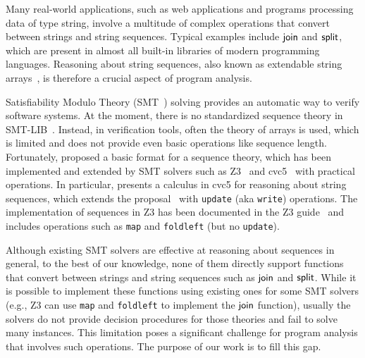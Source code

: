 
Many real-world applications, such as web applications and programs processing data of type string, involve a multitude of complex operations that convert between strings and string sequences. Typical examples include $\mathsf{join}$ and $\mathsf{split}$, which are present in 
almost all built-in libraries of modern programming languages.
%
Reasoning about string sequences, also known as extendable string arrays~\cite{JezLMR23}, is therefore a crucial aspect of program analysis. 

Satisfiability Modulo Theory (SMT~\cite{smt_18}) solving provides an automatic way to verify software systems. 
At the moment, there is no standardized sequence theory in SMT-LIB~\cite{smt_standard}. Instead, in verification tools, often the theory of arrays is used, which is limited and does not provide even basic operations like sequence length. Fortunately, \cite{seq_2012} proposed a basic format for a sequence theory, which has been implemented and extended by SMT solvers such as Z3~\cite{Z3} and cvc5~\cite{BarbosaBBKLMMMN22} with practical operations. In particular, \cite{cvc5_seq} presents a calculus in cvc5 for reasoning about string sequences, which extends the proposal~\cite{seq_2012} with \verb|update| (aka \verb|write|) operations. 
The implementation of sequences in Z3 has been documented in the Z3 guide~\cite{z3_seq_doc} and includes operations such as \verb|map| and \verb|foldleft| (but no \verb|update|).

Although existing SMT solvers are effective at reasoning about sequences in general, to the best of our knowledge, none of them directly support functions that convert between strings and string sequences %
such as $\mathsf{join}$ and $\mathsf{split}$. While it is possible to implement these functions using existing ones for some SMT solvers (e.g., Z3 can use \verb|map| and \verb|foldleft| to implement the $\mathsf{join}$ function), usually the solvers do not provide decision procedures for those theories and fail to solve many instances. 
This limitation poses a significant challenge for program analysis that involves such operations.
%
The purpose of our work is to fill this gap. 



